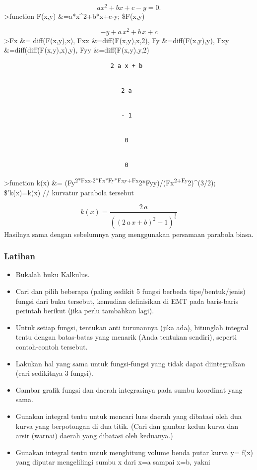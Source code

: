 \documentclass[
]{book}
\begin{document}
\[ax^2+bx+c-y=0.\]\textgreater function F(x,y) \&=a*x\^{}2+b*x+c-y; \$F(x,y)

\[-y+a\,x^2+b\,x+c\]\textgreater Fx \&= diff(F(x,y),x), Fxx \&=diff(F(x,y),x,2), Fy \&=diff(F(x,y),y), Fxy \&=diff(diff(F(x,y),x),y), Fyy \&=diff(F(x,y),y,2)

\begin{verbatim}
                              2 a x + b


                                 2 a


                                 - 1


                                  0


                                  0
\end{verbatim}

\textgreater function k(x) \&= (Fy\textsuperscript{2*Fxx-2*Fx*Fy*Fxy+Fx}2*Fyy)/(Fx\textsuperscript{2+Fy}2)\^{}(3/2); \$'k(x)=k(x) // kurvatur parabola tersebut

\[k\left(x\right)=\frac{2\,a}{\left(\left(2\,a\,x+b\right)^2+1\right)  ^{\frac{3}{2}}}\]Hasilnya sama dengan sebelumnya yang menggunakan persamaan parabola biasa.

\subsubsection{Latihan}\label{latihan-2}

\begin{itemize}
\item
  Bukalah buku Kalkulus.
\item
  Cari dan pilih beberapa (paling sedikit 5 fungsi berbeda tipe/bentuk/jenis) fungsi dari buku tersebut, kemudian definisikan di EMT pada baris-baris perintah berikut (jika perlu tambahkan lagi).
\item
  Untuk setiap fungsi, tentukan anti turunannya (jika ada), hitunglah integral tentu dengan batas-batas yang menarik (Anda tentukan sendiri), seperti contoh-contoh tersebut.
\item
  Lakukan hal yang sama untuk fungsi-fungsi yang tidak dapat diintegralkan (cari sedikitnya 3 fungsi).
\item
  Gambar grafik fungsi dan daerah integrasinya pada sumbu koordinat yang sama.
\item
  Gunakan integral tentu untuk mencari luas daerah yang dibatasi oleh dua kurva yang berpotongan di dua titik. (Cari dan gambar kedua kurva dan arsir (warnai) daerah yang dibatasi oleh keduanya.)
\item
  Gunakan integral tentu untuk menghitung volume benda putar kurva y= f(x) yang diputar mengelilingi sumbu x dari x=a sampai x=b, yakni
\end{itemize}
\end{document}
